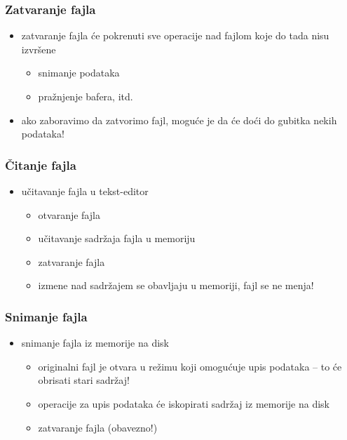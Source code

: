 \documentclass[utf8,compress]{beamer}
\begin{document}
\begin{frame}[fragile]
  \frametitle{Zatvaranje fajla}
  \begin{itemize}
    \item zatvaranje fajla će pokrenuti sve operacije nad fajlom koje do tada nisu izvršene
    \begin{itemize}
      \item snimanje podataka
      \item pražnjenje bafera, itd.
    \end{itemize}
    \item ako zaboravimo da zatvorimo fajl, moguće je da će doći do gubitka nekih podataka!
  \end{itemize}
\end{frame}

\begin{frame}[fragile]
  \frametitle{Čitanje fajla}
  \begin{itemize}
    \item učitavanje fajla u tekst-editor
    \begin{itemize}
      \item otvaranje fajla
      \item učitavanje sadržaja fajla u memoriju
      \item zatvaranje fajla
      \item izmene nad sadržajem se obavljaju u memoriji, fajl se ne menja!
    \end{itemize}
  \end{itemize}
\end{frame}

\begin{frame}[fragile]
  \frametitle{Snimanje fajla}
  \begin{itemize}
    \item snimanje fajla iz memorije na disk
    \begin{itemize}
      \item originalni fajl je otvara u režimu koji omogućuje upis podataka -- to će obrisati stari sadržaj!
      \item operacije za upis podataka će iskopirati sadržaj iz memorije na disk
      \item zatvaranje fajla (obavezno!)
    \end{itemize}
  \end{itemize}
\end{frame}
\end{document}
